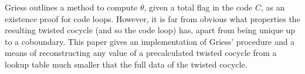 \documentclass[a4paper,debug]{tufte-handout}
\theoremstyle{plain}
\theoremstyle{definition}
\theoremstyle{remark}
\DeclareMathOperator{\Span}{span}
\begin{document}
Griess outlines a method to compute $\theta$, given a total flag in the code $C$, as an existence proof for code loops.
However, it is far from obvious what properties the resulting twisted cocycle (and so the code loop) has, apart from being unique up to a coboundary.
This paper gives an implementation of Griess' procedure and a means of reconstructing any value of a precalculated twisted cocycle from a  lookup table much smaller that the full data of the twisted cocycle.


\end{document}
